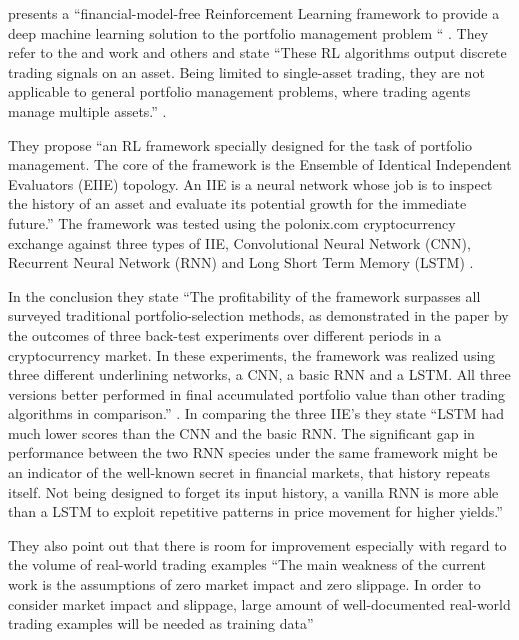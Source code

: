 \documentclass[oneside,12pt]{Classes/RoboticsLaTeX}
\begin{document}
\begin{itemize}
\citet{JiangZhengyao2017ADRL} presents a “financial-model-free Reinforcement Learning framework to provide a deep machine learning solution to the portfolio management problem “ \citep[p1]{JiangZhengyao2017ADRL} . They refer to the \citet{MoodyJohn1998Pfar} and \citet{MoodyJ2001Lttv} work and others and state “These RL algorithms output discrete trading signals on an asset. Being limited to single-asset trading, they are not applicable to general portfolio management problems, where trading agents manage multiple assets.” \citep[p.2]{JiangZhengyao2017ADRL}.

They propose “an RL framework specially designed for the task of portfolio management. The core of the framework is the Ensemble of Identical Independent Evaluators (EIIE) topology. An IIE is a neural network whose job is to inspect the history of an asset and evaluate its potential growth for the immediate future.” The framework was tested using the polonix.com cryptocurrency exchange against three types of IIE, Convolutional Neural Network (CNN), Recurrent Neural Network (RNN) and Long Short Term Memory (LSTM) \citep[p.3]{JiangZhengyao2017ADRL}.

In the conclusion they state “The profitability of the framework surpasses all surveyed traditional portfolio-selection methods, as demonstrated in the paper by the outcomes of three back-test experiments over different periods in a cryptocurrency market. In these experiments, the framework was realized using three different underlining networks, a CNN, a basic RNN and a LSTM. All three versions better performed in final accumulated portfolio value than other trading algorithms in comparison.” \citep[p.20]{JiangZhengyao2017ADRL}. In comparing the three IIE’s they state “LSTM had much lower scores than the CNN and the basic RNN. The significant gap in performance between the two RNN species under the same framework might be an indicator of the well-known secret in financial markets, that history repeats itself. Not being designed to forget its input history, a vanilla RNN is more able than a LSTM to exploit repetitive patterns in price movement for higher yields.” 

They also point out that there is room for improvement especially with regard to the volume of real-world trading examples “The main weakness of the current work is the assumptions of zero market impact and zero slippage. In order to consider market impact and slippage, large amount of well-documented real-world trading examples will be needed as training data”


\end{itemize}
\end{document}
